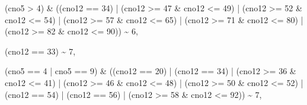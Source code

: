 \documentclass[
]{book}
\newenvironment{Shaded}{\begin{snugshade}}{\end{snugshade}}
\newcommand{\DecValTok}[1]{\textcolor[rgb]{0.00,0.00,0.81}{#1}}
\newcommand{\NormalTok}[1]{#1}
\newcommand{\SpecialCharTok}[1]{\textcolor[rgb]{0.00,0.00,0.00}{#1}}
\begin{document}
\begin{Shaded}
\begin{Highlighting}[]
\NormalTok{                        (cno5 }\SpecialCharTok{\textgreater{}} \DecValTok{4}\NormalTok{) }\SpecialCharTok{\&}\NormalTok{ ((cno12 }\SpecialCharTok{==} \DecValTok{34}\NormalTok{) }\SpecialCharTok{|}\NormalTok{ (cno12 }\SpecialCharTok{\textgreater{}=} \DecValTok{47} \SpecialCharTok{\&}\NormalTok{ cno12 }\SpecialCharTok{\textless{}=} \DecValTok{49}\NormalTok{) }\SpecialCharTok{|}\NormalTok{ (cno12 }\SpecialCharTok{\textgreater{}=} \DecValTok{52} \SpecialCharTok{\&}\NormalTok{ cno12 }\SpecialCharTok{\textless{}=} \DecValTok{54}\NormalTok{) }\SpecialCharTok{|}\NormalTok{ (cno12 }\SpecialCharTok{\textgreater{}=} \DecValTok{57} \SpecialCharTok{\&}\NormalTok{ cno12 }\SpecialCharTok{\textless{}=} \DecValTok{65}\NormalTok{) }\SpecialCharTok{|}\NormalTok{ (cno12 }\SpecialCharTok{\textgreater{}=} \DecValTok{71} \SpecialCharTok{\&}\NormalTok{ cno12 }\SpecialCharTok{\textless{}=} \DecValTok{80}\NormalTok{) }\SpecialCharTok{|}\NormalTok{ (cno12 }\SpecialCharTok{\textgreater{}=} \DecValTok{82} \SpecialCharTok{\&}\NormalTok{ cno12 }\SpecialCharTok{\textless{}=} \DecValTok{90}\NormalTok{)) }\SpecialCharTok{\textasciitilde{}} \DecValTok{6}\NormalTok{,}
                        
\NormalTok{                        (cno12 }\SpecialCharTok{==} \DecValTok{33}\NormalTok{)   }\SpecialCharTok{\textasciitilde{}} \DecValTok{7}\NormalTok{,}
                        
\NormalTok{                        (cno5 }\SpecialCharTok{==} \DecValTok{4} \SpecialCharTok{|}\NormalTok{ cno5 }\SpecialCharTok{==} \DecValTok{9}\NormalTok{) }\SpecialCharTok{\&}\NormalTok{ ((cno12 }\SpecialCharTok{==} \DecValTok{20}\NormalTok{) }\SpecialCharTok{|}\NormalTok{ (cno12 }\SpecialCharTok{==} \DecValTok{34}\NormalTok{) }\SpecialCharTok{|} 
\NormalTok{                        (cno12 }\SpecialCharTok{\textgreater{}=} \DecValTok{36} \SpecialCharTok{\&}\NormalTok{ cno12 }\SpecialCharTok{\textless{}=} \DecValTok{41}\NormalTok{) }\SpecialCharTok{|}\NormalTok{ (cno12 }\SpecialCharTok{\textgreater{}=} \DecValTok{46} \SpecialCharTok{\&}\NormalTok{ cno12 }\SpecialCharTok{\textless{}=} \DecValTok{48}\NormalTok{) }\SpecialCharTok{|}
\NormalTok{                        (cno12 }\SpecialCharTok{\textgreater{}=} \DecValTok{50} \SpecialCharTok{\&}\NormalTok{ cno12 }\SpecialCharTok{\textless{}=} \DecValTok{52}\NormalTok{) }\SpecialCharTok{|}\NormalTok{ (cno12 }\SpecialCharTok{==} \DecValTok{54}\NormalTok{) }\SpecialCharTok{|}\NormalTok{ (cno12 }\SpecialCharTok{==} \DecValTok{56}\NormalTok{) }\SpecialCharTok{|} 
\NormalTok{                        (cno12 }\SpecialCharTok{\textgreater{}=} \DecValTok{58} \SpecialCharTok{\&}\NormalTok{ cno12 }\SpecialCharTok{\textless{}=} \DecValTok{92}\NormalTok{)) }\SpecialCharTok{\textasciitilde{}} \DecValTok{7}\NormalTok{,}
                        

\end{Highlighting}
\end{Shaded}
\end{document}
